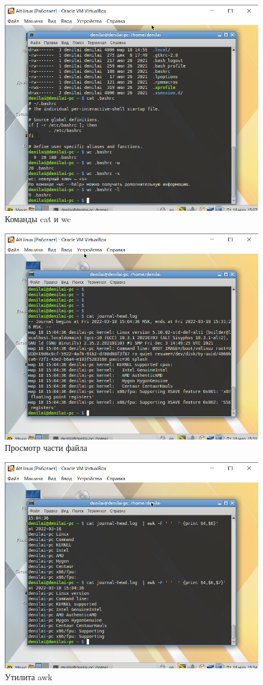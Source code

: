 \documentclass[a4paper,14pt]{extarticle}
\begin{document}
\begin{figure}[h!]
	\centering
	\includegraphics[width=0.7\linewidth]{"images/Практика МИРЭА/Alt linux [Работает] - Oracle VM VirtualBox 18.03.2022 15_07_38"}
	\caption{Команды cat и wc}
	\label{fig:cat-wc}
\end{figure}
\begin{figure}[h!]
	\centering
	\includegraphics[width=0.7\linewidth]{"images/Практика МИРЭА/Alt linux [Работает] - Oracle VM VirtualBox 18.03.2022 15_31_40"}
	\caption{Просмотр части файла}
	\label{fig:cat}
\end{figure}
\begin{figure}[h!]
	\centering
	\includegraphics[width=0.7\linewidth]{"images/Практика МИРЭА/Alt linux [Работает] - Oracle VM VirtualBox 18.03.2022 15_34_15"}
	\caption{Утилита awk}
	\label{fig:awk}
\end{figure}
\end{document}
